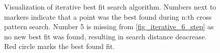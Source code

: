 \begin{figure}
\caption{Visualization of iterative best fit search algorithm. Numbers next to markers indicate that a point was the best found during n:th cross pattern search. Number 5 is missing from \ref{fig_iterative_6_step} as no new best fit was found, resulting in search distance deacrease. Red circle marks the best found fit.}
     \label{fig_iterative_visual_1}
\end{figure}








